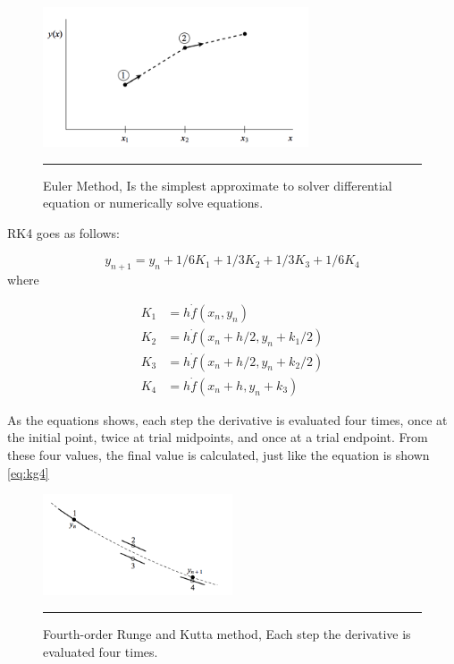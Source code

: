 \begin{figure}[htbp]
	\centering
		\includegraphics[width=0.7\textwidth]{Figures/euler.png}
		\rule{35em}{0.5pt}
	\caption[Euler Method]{Euler Method, Is the simplest approximate to solver differential equation or numerically solve equations.}
	\label{fig:euler}
\end{figure}

RK4 goes as follows:

\begin{equation} \label{eq:kg4}
y_{n+1} = y_{n} + 1/6 K_{1} + 1/3 K_{2} +1/3 K_{3} + 1/6 K_{4} 
\end{equation}
where

\begin{align*}
K_{1} &= h \dot f(x_{n}, y_{n}) \\
K_{2} &= h \dot f(x_{n} + h/2, y_{n} + k_{1}/2) \\
K_{3} &= h \dot f(x_{n} + h/2, y_{n} + k_{2}/2) \\
K_{4} &= h \dot f(x_{n} + h, y_{n} + k_{3})
\end{align*}

As the equations shows, each step the derivative is evaluated four times, once at the initial point, twice at trial midpoints, and once at a trial endpoint. From these four values, the final value is calculated, just like the equation is shown \ref{eq:kg4}

\begin{figure}[htbp]
	\centering
		\includegraphics[width=0.5\textwidth]{Figures/rk4.png}
		\rule{35em}{0.5pt}
	\caption[Fourth-order Runge and Kutta Method]{Fourth-order Runge and Kutta method, Each step the derivative is evaluated four times. }
	\label{fig:kutta}
\end{figure}

